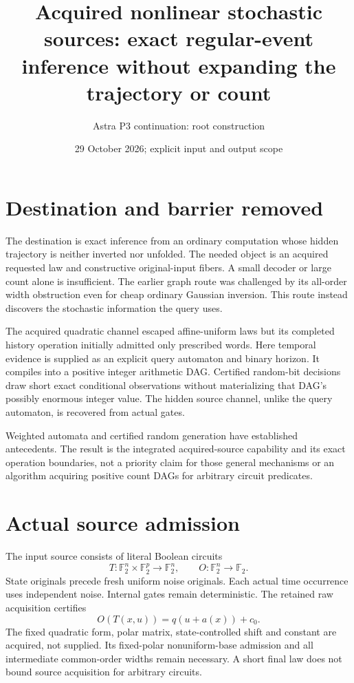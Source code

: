 \documentclass[11pt]{article}
\title{Acquired nonlinear stochastic sources: exact regular-event inference without expanding the trajectory or count}
\author{Astra P3 continuation: root construction}
\date{29 October 2026; explicit input and output scope}
\newcommand{\F}{\mathbb F_2}
\begin{document}
\maketitle

\section{Destination and barrier removed}
The destination is exact inference from an ordinary computation whose hidden
trajectory is neither inverted nor unfolded. The needed object is an acquired
requested law and constructive original-input fibers. A small decoder or large
count alone is insufficient. The earlier graph route was challenged by its
all-order width obstruction even for cheap ordinary Gaussian inversion. This
route instead discovers the stochastic information the query uses.

The acquired quadratic channel escaped affine-uniform laws but its completed
history operation initially admitted only prescribed words. Here temporal
evidence is supplied as an explicit query automaton and binary horizon. It
compiles into a positive integer arithmetic DAG. Certified random-bit decisions
draw short exact conditional observations without materializing that DAG's
possibly enormous integer value. The hidden source channel, unlike the query
automaton, is recovered from actual gates.

Weighted automata and certified random generation have established antecedents.
The result is the integrated acquired-source capability and its exact operation
boundaries, not a priority claim for those general mechanisms or an algorithm
acquiring positive count DAGs for arbitrary circuit predicates.

\section{Actual source admission}
The input source consists of literal Boolean circuits
\[
 T:\F^n\times\F^p\to\F^n,\qquad O:\F^n\to\F .
\]
State originals precede fresh uniform noise originals. Each actual time
occurrence uses independent noise. Internal gates remain deterministic.
The retained raw acquisition certifies
\[
                       O(T(x,u))=q(u+a(x))+c_0.                 \tag{1}
\]
The fixed quadratic form, polar matrix, state-controlled shift and constant
are acquired, not supplied. Its fixed-polar nonuniform-base admission and all
intermediate common-order widths remain necessary. A short final law does not
bound source acquisition for arbitrary circuits.
\end{document}
